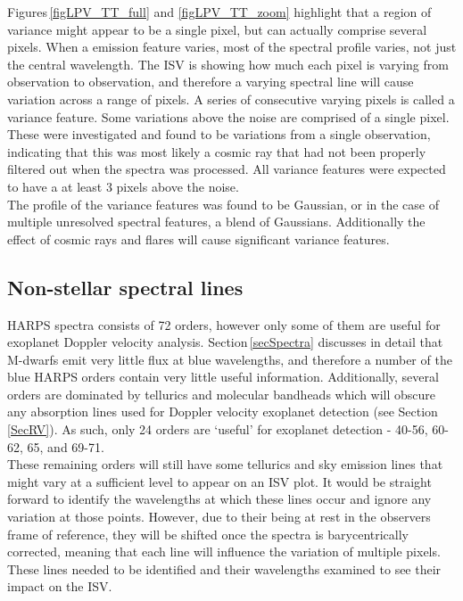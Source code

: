 Figures\,\ref{figLPV_TT_full} and \ref{figLPV_TT_zoom} highlight that a region of variance might appear to be a single pixel, but can actually comprise several pixels. When a emission feature varies, most of the spectral profile varies, not just the central wavelength. The ISV is showing how much each pixel is varying from observation to observation, and therefore a varying spectral line will cause variation across a range of pixels. A series of consecutive varying pixels is called a variance feature. Some variations above the noise are comprised of a single pixel. These were investigated and found to be variations from a single observation, indicating that this was most likely a cosmic ray that had not been properly filtered out when the spectra was processed. All variance features were expected to have a at least 3 pixels above the noise.\\

The profile of the variance features was found to be Gaussian, or in the case of multiple unresolved spectral features, a blend of Gaussians. Additionally the effect of cosmic rays and flares will cause significant variance features.

\subsection{Non-stellar spectral lines}
\label{secNonStellarLines}
HARPS spectra consists of 72 orders, however only some of them are useful for exoplanet Doppler velocity analysis. Section\,\ref{secSpectra} discusses in detail that M-dwarfs emit very little flux at blue wavelengths, and therefore a number of the blue HARPS orders contain very little useful information. Additionally, several orders are dominated by tellurics and molecular bandheads which will obscure any absorption lines used for Doppler velocity exoplanet detection (see Section\,\ref{SecRV}). As such, only 24 orders are `useful' for exoplanet detection - 40-56, 60-62, 65, and 69-71.\\

These remaining orders will still have some tellurics and sky emission lines that might vary at a sufficient level to appear on an ISV plot. It would be straight forward to identify the wavelengths at which these lines occur and ignore any variation at those points. However, due to their being at rest in the observers frame of reference, they will be shifted once the spectra is barycentrically corrected, meaning that each line will influence the variation of multiple pixels. These lines needed to be identified and their wavelengths examined to see their impact on the ISV.\\

